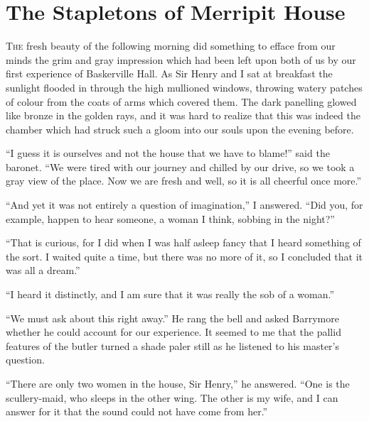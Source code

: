 \documentclass[paper=5.5in:8.5in,BCOR=7mm,twoside,DIV=calc,12pt,usegeometry,openany,chapterprefix,endperiod,headings=big]{scrbook} %
\begin{document}
\chapter{The Stapletons of Merripit House}
\lettrine[lines=1]{T}{he} fresh beauty of the following morning did something to efface from our minds the grim and gray impression which had been left upon both of us by our first experience of Baskerville Hall. As Sir Henry and I sat at breakfast the sunlight flooded in through the high mullioned windows, throwing watery patches of colour from the coats of arms which covered them. The dark panelling glowed like bronze in the golden rays, and it was hard to realize that this was indeed the chamber which had struck such a gloom into our souls upon the evening before.

\enquote{I guess it is ourselves and not the house that we have to blame!} said the baronet. \enquote{We were tired with our journey and chilled by our drive, so we took a gray view of the place. Now we are fresh and well, so it is all cheerful once more.}

\enquote{And yet it was not entirely a question of imagination,} I an\-swered. \enquote{Did you, for example, happen to hear someone, a woman I think, sobbing in the night?}

\enquote{That is curious, for I did when I was half asleep fancy that I heard something of the sort. I waited quite a time, but there was no more of it, so I concluded that it was all a dream.}

\enquote{I heard it distinctly, and I am sure that it was really the sob of a woman.}

\enquote{We must ask about this right away.} He rang the bell and asked Barrymore whether he could account for our experience. It seemed to me that the pallid features of the butler turned a shade paler still as he listened to his master's question.

\enquote{There are only two women in the house, Sir Henry,} he an\-swered. \enquote{One is the scullery-maid, who sleeps in the other wing. The other is my wife, and I can answer for it that the sound could not have come from her.}
\end{document}
